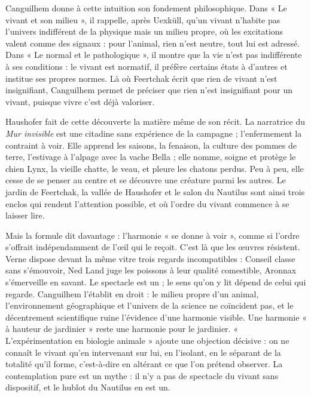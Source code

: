 \documentclass[11pt,a4paper]{article}
\begin{document}
Canguilhem donne à cette intuition son fondement philosophique. Dans « Le vivant et son milieu », il rappelle, après Uexküll, qu'un vivant n'habite pas l'univers indifférent de la physique mais un milieu propre, où les excitations valent comme des signaux : pour l'animal, rien n'est neutre, tout lui est adressé. Dans « Le normal et le pathologique », il montre que la vie n'est pas indifférente à ses conditions : le vivant est normatif, il préfère certains états à d'autres et institue ses propres normes. Là où Feertchak écrit que rien de vivant n'est insignifiant, Canguilhem permet de préciser que rien n'est insignifiant pour un vivant, puisque vivre c'est déjà valoriser.

Haushofer fait de cette découverte la matière même de son récit. La narratrice du \emph{Mur invisible} est une citadine sans expérience de la campagne ; l'enfermement la contraint à voir. Elle apprend les saisons, la fenaison, la culture des pommes de terre, l'estivage à l'alpage avec la vache Bella ; elle nomme, soigne et protège le chien Lynx, la vieille chatte, le veau, et pleure les chatons perdus. Peu à peu, elle cesse de se penser au centre et se découvre une créature parmi les autres. Le jardin de Feertchak, la vallée de Haushofer et le salon du Nautilus sont ainsi trois enclos qui rendent l'attention possible, et où l'ordre du vivant commence à se laisser lire.

Mais la formule dit davantage : l'harmonie « se donne à voir », comme si l'ordre s'offrait indépendamment de l'œil qui le reçoit. C'est là que les œuvres résistent. Verne dispose devant la même vitre trois regards incompatibles : Conseil classe sans s'émouvoir, Ned Land juge les poissons à leur qualité comestible, Aronnax s'émerveille en savant. Le spectacle est un ; le sens qu'on y lit dépend de celui qui regarde. Canguilhem l'établit en droit : le milieu propre d'un animal, l'environnement géographique et l'univers de la science ne coïncident pas, et le décentrement scientifique ruine l'évidence d'une harmonie visible. Une harmonie « à hauteur de jardinier » reste une harmonie pour le jardinier. « L'expérimentation en biologie animale » ajoute une objection décisive : on ne connaît le vivant qu'en intervenant sur lui, en l'isolant, en le séparant de la totalité qu'il forme, c'est-à-dire en altérant ce que l'on prétend observer. La contemplation pure est un mythe : il n'y a pas de spectacle du vivant sans dispositif, et le hublot du Nautilus en est un.
\end{document}
